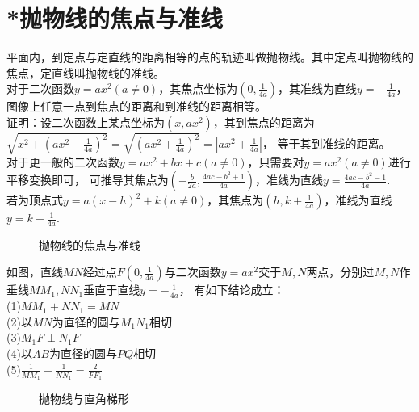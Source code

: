\section{*抛物线的焦点与准线}
\begin{theorem}
    平面内，到定点与定直线的距离相等的点的轨迹叫做抛物线。其中定点叫抛物线的焦点，定直线叫抛物线的准线。\\
    对于二次函数$y=ax^2(a\ne 0)$，其焦点坐标为$(0,\frac{1}{4a})$，其准线为直线$y=-\frac{1}{4a}$，图像上任意一点到焦点的距离和到准线的距离相等。\\
    证明：设二次函数上某点坐标为$(x,ax^2)$，其到焦点的距离为$\sqrt{x^2+(ax^2-\frac{1}{4a})^2}=\sqrt{(ax^2+\frac{1}{4a})^2}=|ax^2+\frac{1}{4a}|$，
    等于其到准线的距离。\\
    对于更一般的二次函数$y=ax^2+bx+c(a\ne 0)$，只需要对$y=ax^2(a\ne 0)$进行平移变换即可，
    可推导其焦点为$(-\frac{b}{2a},\frac{4ac-b^2+1}{4a})$，准线为直线$y=\frac{4ac-b^2-1}{4a}$. \\
    若为顶点式$y=a(x-h)^2+k(a \ne 0)$，其焦点为$(h,k+\frac{1}{4a})$，准线为直线$y=k-\frac{1}{4a}$. \\
\end{theorem}
\begin{figure}[H]
    \centering
    \resizebox{4cm}{!}{}
    \caption{抛物线的焦点与准线}
\end{figure}
\begin{definition}
    如图，直线$MN$经过点$F(0,\frac{1}{4a})$与二次函数$y=ax^2$交于$M,N$两点，分别过$M,N$作垂线$MM_1,NN_1$垂直于直线$y=-\frac{1}{4a}$，
    有如下结论成立：\\
    (1)$MM_1+NN_1=MN$ \\
    (2)以$MN$为直径的圆与$M_1N_1$相切 \\
    (3)$M_1F \perp N_1F$ \\
    (4)以$AB$为直径的圆与$PQ$相切 \\
    (5)$\frac{1}{MM_1}+\frac{1}{NN_1}=\frac{2}{FF_1}$
\end{definition}
\begin{figure}[H]
    \centering
    \resizebox{4cm}{!}{}
    \caption{抛物线与直角梯形}
\end{figure}
\clearpage
